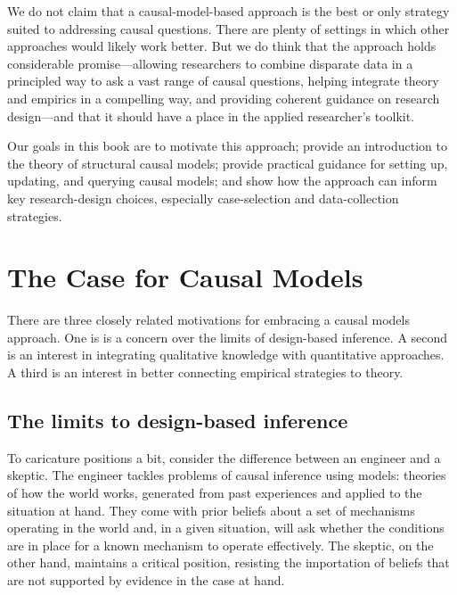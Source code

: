 \documentclass[
  12pt,
]{book}
\begin{document}
We do not claim that a causal-model-based approach is the best or only strategy suited to addressing causal questions. There are plenty of settings in which other approaches would likely work better. But we do think that the approach holds considerable promise---allowing researchers to combine disparate data in a principled way to ask a vast range of causal questions, helping integrate theory and empirics in a compelling way, and providing coherent guidance on research design---and that it should have a place in the applied researcher's toolkit.

Our goals in this book are to motivate this approach; provide an introduction to the theory of structural causal models; provide practical guidance for setting up, updating, and querying causal models; and show how the approach can inform key research-design choices, especially case-selection and data-collection strategies.

\hypertarget{the-case-for-causal-models}{%
\section{The Case for Causal Models}\label{the-case-for-causal-models}}

There are three closely related motivations for embracing a causal models approach.
One is is a concern over the limits of design-based inference. A second is an interest in integrating qualitative knowledge with quantitative approaches. A third is an interest in better connecting empirical strategies to theory.

\hypertarget{the-limits-to-design-based-inference}{%
\subsection{The limits to design-based inference}\label{the-limits-to-design-based-inference}}

To caricature positions a bit, consider the difference between an engineer and a skeptic. The engineer tackles problems of causal inference using models: theories of how the world works, generated from past experiences and applied to the situation at hand. They come with prior beliefs about a set of mechanisms operating in the world and, in a given situation, will ask whether the conditions are in place for a known mechanism to operate effectively. The skeptic, on the other hand, maintains a critical position, resisting the importation of beliefs that are not supported by evidence in the case at hand.
\end{document}
